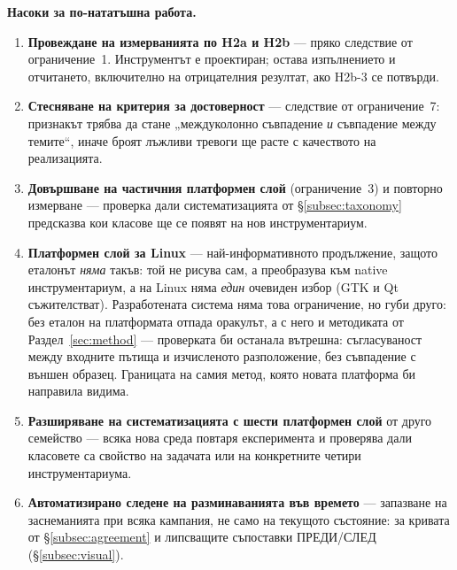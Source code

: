 \textbf{Насоки за по-нататъшна работа.}
\begin{enumerate}[topsep=2pt,itemsep=2pt,leftmargin=*]
\item \textbf{Провеждане на измерванията по H2a и H2b} --- пряко следствие от ограничение~1.
      Инструментът е проектиран; остава изпълнението и отчитането, включително на отрицателния
      резултат, ако H2b-3 се потвърди.
\item \textbf{Стесняване на критерия за достоверност} --- следствие от ограничение~7: признакът
      трябва да стане „междуколонно съвпадение \emph{и} съвпадение между темите“, иначе броят
      лъжливи тревоги ще расте с качеството на реализацията.
\item \textbf{Довършване на частичния платформен слой} (ограничение~3) и повторно измерване ---
      проверка дали систематизацията от §\ref{subsec:taxonomy} предсказва кои класове ще се
      появят на нов инструментариум.
\item \textbf{Платформен слой за Linux} --- най-информативното продължение, защото еталонът
      \emph{няма} такъв: той не рисува сам, а преобразува към native инструментариум, а на Linux
      няма \emph{един} очевиден избор (GTK и Qt съжителстват). Разработената система няма това
      ограничение, но губи друго: без еталон на платформата отпада оракулът, а с него и
      методиката от Раздел~\ref{sec:method} --- проверката би останала вътрешна: съгласуваност
      между входните пътища и изчисленото разположение, без съвпадение с външен образец. Границата
      на самия метод, която новата платформа би направила видима.
\item \textbf{Разширяване на систематизацията с шести платформен слой} от друго семейство ---
      всяка нова среда повтаря експеримента и проверява дали класовете са свойство на задачата или
      на конкретните четири инструментариума.
\item \textbf{Автоматизирано следене на разминаванията във времето} --- запазване на заснеманията
      при всяка кампания, не само на текущото състояние: за кривата от §\ref{subsec:agreement} и
      липсващите съпоставки ПРЕДИ/СЛЕД (§\ref{subsec:visual}).
\end{enumerate}
